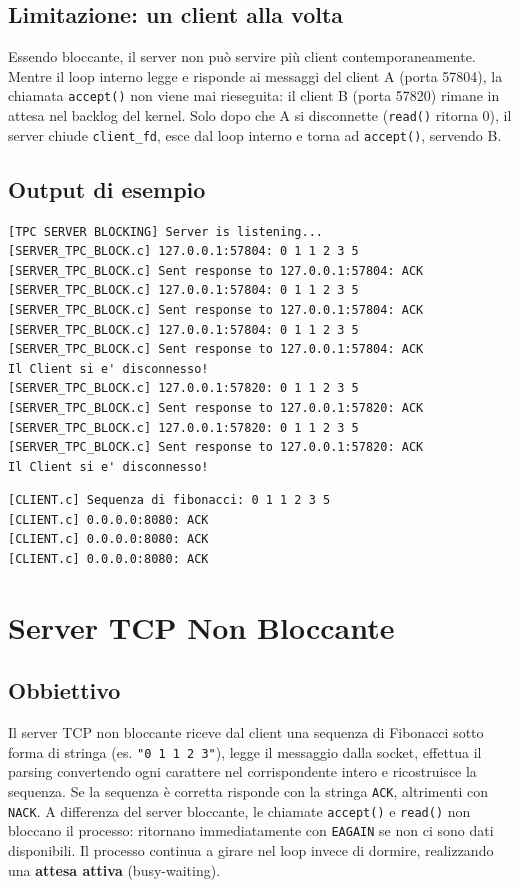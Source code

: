 \documentclass[a4paper,12pt]{article}
\begin{document}
\subsection{Limitazione: un client alla volta}
Essendo bloccante, il server non può servire più client contemporaneamente.
Mentre il loop interno legge e risponde ai messaggi del client A (porta 57804),
la chiamata \texttt{accept()} non viene mai rieseguita: il client B (porta 57820)
rimane in attesa nel backlog del kernel. Solo dopo che A si disconnette
(\texttt{read()} ritorna 0), il server chiude \texttt{client\_fd}, esce dal loop
interno e torna ad \texttt{accept()}, servendo B.

\subsection{Output di esempio}

\begin{lstlisting}[style=output,caption={Output server - due client sequenziali}]
[TPC SERVER BLOCKING] Server is listening...
[SERVER_TPC_BLOCK.c] 127.0.0.1:57804: 0 1 1 2 3 5
[SERVER_TPC_BLOCK.c] Sent response to 127.0.0.1:57804: ACK
[SERVER_TPC_BLOCK.c] 127.0.0.1:57804: 0 1 1 2 3 5
[SERVER_TPC_BLOCK.c] Sent response to 127.0.0.1:57804: ACK
[SERVER_TPC_BLOCK.c] 127.0.0.1:57804: 0 1 1 2 3 5
[SERVER_TPC_BLOCK.c] Sent response to 127.0.0.1:57804: ACK
Il Client si e' disconnesso!
[SERVER_TPC_BLOCK.c] 127.0.0.1:57820: 0 1 1 2 3 5
[SERVER_TPC_BLOCK.c] Sent response to 127.0.0.1:57820: ACK
[SERVER_TPC_BLOCK.c] 127.0.0.1:57820: 0 1 1 2 3 5
[SERVER_TPC_BLOCK.c] Sent response to 127.0.0.1:57820: ACK
Il Client si e' disconnesso!
\end{lstlisting}
\FloatBarrier

\begin{lstlisting}[style=output,caption={Output client - ./client 5 3}]
[CLIENT.c] Sequenza di fibonacci: 0 1 1 2 3 5
[CLIENT.c] 0.0.0.0:8080: ACK
[CLIENT.c] 0.0.0.0:8080: ACK
[CLIENT.c] 0.0.0.0:8080: ACK
\end{lstlisting}
\FloatBarrier

\section{Server TCP Non Bloccante}

\subsection{Obbiettivo}
Il server TCP non bloccante riceve dal client una sequenza di Fibonacci sotto
forma di stringa (es. \texttt{"0 1 1 2 3"}), legge il messaggio dalla socket,
effettua il parsing convertendo ogni carattere nel corrispondente intero e
ricostruisce la sequenza. Se la sequenza è corretta risponde con la stringa
\texttt{ACK}, altrimenti con \texttt{NACK}.
\newline
A differenza del server bloccante, le chiamate \texttt{accept()} e \texttt{read()}
non bloccano il processo: ritornano immediatamente con \texttt{EAGAIN} se non ci
sono dati disponibili. Il processo continua a girare nel loop invece di dormire,
realizzando una \textbf{attesa attiva} (busy-waiting).
\end{document}
